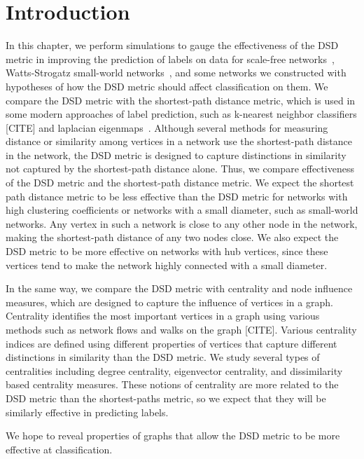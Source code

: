\section{Introduction}

In this chapter, we perform simulations to gauge the effectiveness of the DSD metric in improving the prediction of labels on data for scale-free networks~\cite{PhysRevLett.90.058701}, Watts-Strogatz small-world networks~\cite{Watts1998Collective}, and some networks we constructed with hypotheses of how the DSD metric should affect classification on them. We compare the DSD metric with the shortest-path distance metric, which is used in some modern approaches of label prediction, such as k-nearest neighbor classifiers [CITE] and laplacian eigenmaps~\cite{belkin2002laplacian}. Although several methods for measuring distance or similarity among vertices in a network use the shortest-path distance in the network, the DSD metric is designed to capture distinctions in similarity not captured by the shortest-path distance alone. Thus, we compare effectiveness of the DSD metric and the shortest-path distance metric. We expect the shortest path distance metric to be less effective than the DSD metric for networks with high clustering coefficients or networks with a small diameter, such as small-world networks. Any vertex in such a network is close to any other node in the network, making the shortest-path distance of any two nodes close. We also expect the DSD metric to be more effective on networks with hub vertices, since these vertices tend to make the network highly connected with a small diameter.

In the same way, we compare the DSD metric with centrality and node influence measures, which are designed to capture the influence of vertices in a graph. Centrality identifies the most important vertices in a graph using various methods such as network flows and walks on the graph [CITE]. Various centrality indices are defined using different properties of vertices that capture different distinctions in similarity than the DSD metric. We study several types of centralities including degree centrality, eigenvector centrality, and dissimilarity based centrality measures. These notions of centrality are more related to the DSD metric than the shortest-paths metric, so we expect that they will be similarly effective in predicting labels.

We hope to reveal properties of graphs that allow the DSD metric to be more effective at classification.


